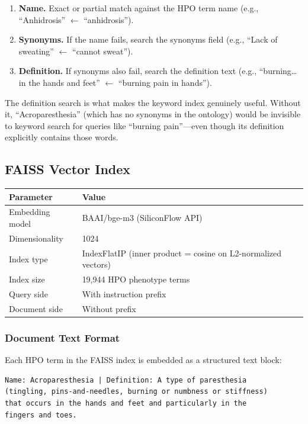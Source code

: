 \documentclass[11pt,a4paper]{article}
\begin{document}
\begin{enumerate}[leftmargin=*]
  \item \textbf{Name.} Exact or partial match against the HPO term name (e.g., ``Anhidrosis'' $\leftarrow$ ``anhidrosis'').
  \item \textbf{Synonyms.} If the name fails, search the synonyms field (e.g., ``Lack of sweating'' $\leftarrow$ ``cannot sweat'').
  \item \textbf{Definition.} If synonyms also fail, search the definition text (e.g., ``burning\ldots in the hands and feet'' $\leftarrow$ ``burning pain in hands'').
\end{enumerate}

The definition search is what makes the keyword index genuinely useful. Without it, ``Acroparesthesia'' (which has no synonyms in the ontology) would be invisible to keyword search for queries like ``burning pain''—even though its definition explicitly contains those words.

\subsection{FAISS Vector Index}

\begin{table}[H]
\centering
\begin{tabular}{@{}ll@{}}
\toprule
\textbf{Parameter} & \textbf{Value} \\
\midrule
Embedding model & BAAI/bge-m3 (SiliconFlow API) \\
Dimensionality & 1024 \\
Index type & IndexFlatIP (inner product = cosine on L2-normalized vectors) \\
Index size & 19,944 HPO phenotype terms \\
Query side & With instruction prefix \\
Document side & Without prefix \\
\bottomrule
\end{tabular}
\end{table}

\subsubsection{Document Text Format}

Each HPO term in the FAISS index is embedded as a structured text block:

\begin{lstlisting}[caption={Index text for Acroparesthesia (HP:0031006)}]
Name: Acroparesthesia | Definition: A type of paresthesia
(tingling, pins-and-needles, burning or numbness or stiffness)
that occurs in the hands and feet and particularly in the
fingers and toes.
\end{lstlisting}
\end{document}
